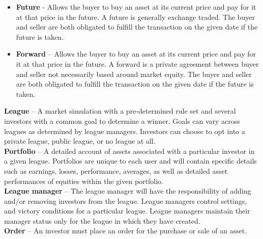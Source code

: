 {\begin{itemize}
    \item \textbf{Future} - Allows the buyer to buy an asset at its current
price and pay for it at that price in the future. A future is
generally exchange traded. The buyer and seller are both obligated
to fulfill the transaction on the given date if the future is taken.\\

    \item \textbf{Forward} -- Allows the buyer to buy an asset at its current
price and pay for it at that price in the future. A forward is a
private agreement between buyer and seller not necessarily based around
market equity. The buyer and seller are both obligated to fulfill
the transaction on the given date if the future is taken.\\
\end{itemize}

\textbf{League} -- A market simulation with a pre-determined rule set
and several investors with a common goal to determine a winner. Goals
can vary across leagues as determined by league managers. Investors can
choose to opt into a private league, public league, or no league at all.\\

\textbf{Portfolio} -- A detailed account of assets associated with a
particular investor in a given league. Portfolios are unique to each user
and will contain specific details such as earnings, losses, performance,
averages, as well as detailed asset performances of equities within the
given portfolio.\\

\textbf{League manager} -- The league manager will have the responsibility
of adding and/or removing investors from the league. League managers
control settings, and victory conditions for a particular league. League
managers maintain their manager status only for the league in which they
have created.\\

\textbf{Order} -- An investor must place an order for the purchase or
sale of an asset.\\

}
